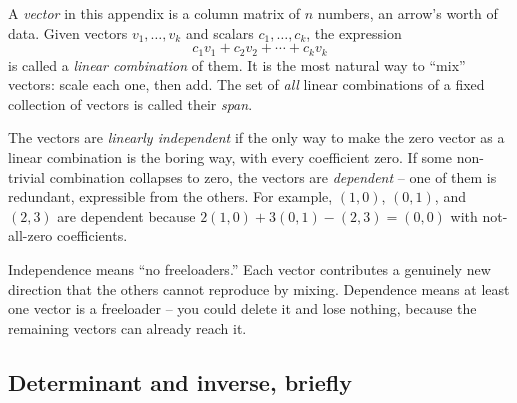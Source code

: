 A \emph{vector} in this appendix is a column matrix of $n$ numbers, an
arrow's worth of data. Given vectors $v_1, \dots, v_k$ and scalars
$c_1, \dots, c_k$, the expression
\[
c_1 v_1 + c_2 v_2 + \cdots + c_k v_k
\]
is called a \emph{linear combination} of them. It is the most natural way to
``mix'' vectors: scale each one, then add. The set of \emph{all} linear
combinations of a fixed collection of vectors is called their \emph{span}.

The vectors are \emph{linearly independent} if the only way to make the zero
vector as a linear combination is the boring way, with every coefficient zero. If
some non-trivial combination collapses to zero, the vectors are
\emph{dependent} -- one of them is redundant, expressible from the others. For
example, $(1,0)$, $(0,1)$, and $(2,3)$ are dependent because
$2(1,0) + 3(0,1) - (2,3) = (0,0)$ with not-all-zero coefficients.

\begin{intuitionbox}
Independence means ``no freeloaders.'' Each vector contributes a genuinely new
direction that the others cannot reproduce by mixing. Dependence means at least
one vector is a freeloader -- you could delete it and lose nothing, because the
remaining vectors can already reach it.
\end{intuitionbox}

\subsection{Determinant and inverse, briefly}

